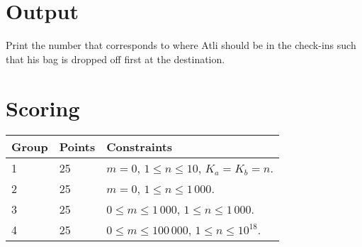 \section*{Output}
Print the number that corresponds to where Atli should be in the check-ins such that his bag is dropped off first at the destination.

\section*{Scoring}
\begin{tabular}{|l|l|l|}
\hline
Group & Points & Constraints \\ \hline
1     & 25   & $m = 0$, $1 \leq n \leq 10$, $K_a = K_b = n$. \\ \hline
2     & 25   & $m = 0$, $1 \leq n \leq 1\,000$. \\ \hline
3     & 25   & $0 \leq m \leq 1\,000$, $1 \leq n \leq 1\,000$. \\ \hline
4     & 25   & $0 \leq m \leq 100\,000$, $1 \leq n \leq 10^{18}$. \\ \hline
\end{tabular}
